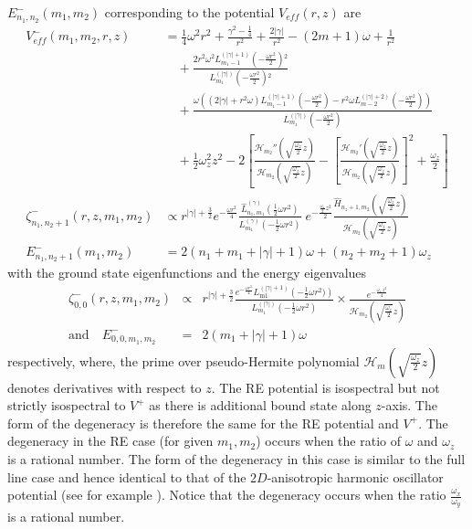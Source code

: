 \documentclass[12pt]{article}
\numberwithin{equation}{section} %
\begin{document}
$E^-_{n_1,n_2}(m_1,m_2)$ corresponding to the potential $V_{eff}(r,z)$ are
\begin{align}
    V_{eff}^-(m_1, m_2, r, z) &= \frac{1}{4}\omega^2 r^2 + \frac{\gamma^2 - \frac{1}{4}}{r^2} + \frac{2 | \gamma | }{r^2}-(2 m+1) \omega +\frac{1}{r^2} \nonumber\\
    &\quad + \frac{2 r^2 \omega ^2 L_{m_1-1}^{(| \gamma | +1)}\left(-\frac{\omega r^2}{2}\right){}^2}{L_{m_1}^{(| \gamma |) }\left(-\frac{\omega r^2}{2}\right){}^2} \nonumber\\
    &\quad + \frac{\omega  \left(\left(2 | \gamma | +r^2 \omega \right) L_{m_1-1}^{(| \gamma | +1)}\left(-\frac{\omega r^2}{2}\right)-r^2 \omega  L_{m-2}^{(| \gamma | +2)}\left(-\frac{\omega r^2}{2}\right)\right)}{L_{m_1}^{(| \gamma | )}\left(-\frac{\omega r^2}{2}\right)}\nonumber\\
    &\quad + \frac{1}{2}\omega_z^2 z^2 - 2\left[\frac{\mathcal{H}_{m_2}''\left(\sqrt{\frac{\omega_z}{2}} z\right)}{\mathcal{H}_{m_2}\left(\sqrt{\frac{\omega_z}{2}} z\right)}-\left[\frac{\mathcal{H}_{m_2}'\left(\sqrt{\frac{\omega_z}{2}} z\right)}{\mathcal{H}_{m_2}\left(\sqrt{\frac{\omega_z}{2}} z\right)}\right]^2+\frac{\omega_z}{2}\right] \nonumber\\
    \zeta_{n_1, n_2+1}^-(r, z, m_1, m_2) &\propto r^{|\gamma| + \frac{3}{2}} e^{-\frac{\omega r^2}{4}} \frac{\hat{L}_{n_1, m_1}^{(\gamma)}\left(\frac{1}{2}\omega r^2 \right)}{L_{m_1}^{(\gamma)}\left(-\frac{1}{2}\omega r^2 \right)}\; e^{-\frac{\frac{\omega_z}{2} z^2}{2}} \frac{\hat{H}_{n_z+1, m_2}\left(\sqrt{\frac{\omega_z}{2}} z \right)}{\mathcal{H}_{m_2}\left(\sqrt{\frac{\omega_z}{2}} z \right)} \nonumber\\
    E^-_{n_1, n_2+1}(m_1, m_2) &= 2(n_1 + m_1 + |\gamma| + 1)\omega + \left(n_2 + m_2 + 1\right)\omega_z
\end{align}
with the ground state eigenfunctions and the energy eigenvalues 
\begin{eqnarray}
\zeta_{0,0}^-(r,z,m_1,m_2)&\propto& r^{|\gamma| +\frac{3}{2}}  \frac{e^{-\frac{\omega r^2}{4}}L_{\text{m1}}^{(| \gamma | +1)}\left(-\frac{1}{2}\omega r^2)\right)}{L_{m_1}^{(|\gamma |)}\left(-\frac{1}{2}\omega r^2 \right)}\times
\frac{e^{-\frac{\omega_z\;  z^2}{4}}}{\mathcal{H}_{m_2}^{}\left(\sqrt{\frac{\omega_z}{2}}  z \right)}  \nonumber\\
\mbox{and} \quad E^-_{0,0,m_1,m_2}&=&2(m_1+|\gamma|+1)\omega
\end{eqnarray}
respectively, where, the prime over pseudo-Hermite polynomial 
$\mathcal{H}_m(\sqrt{\frac{\omega_z}{2}} z)$ denotes derivatives with respect to $z$. The RE potential is isospectral but not strictly isospectral to $V^{+}$ as there is additional bound state along $z$-axis. The form of the degeneracy is therefore the same for the RE potential and $V^{+}$. The degeneracy in the RE case (for given $m_1, m_2$) occurs when the ratio of $\omega$ and $\omega_z$ is a rational number.
The form of the degeneracy in this case is similar to the full line case and
hence identical to that of the $2D$-anisotropic harmonic oscillator potential 
(see for example \cite{louck1973canonical}). Notice that the degeneracy occurs 
when the ratio $\frac{\omega_x}{\omega_y}$ is a rational number.
\end{document}
